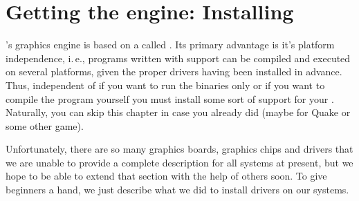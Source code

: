 
\chapter{Getting the engine: Installing  \label{opengl}}

\FlightGear's graphics engine is based on a  called
. Its primary advantage is it's platform independence, i.\,e., programs
written with  support can be compiled and executed on several platforms,
given the proper drivers having been installed in advance. Thus, independent of if you
want to run the binaries only or if you want to compile the program yourself you must
install some sort of  support for your . Naturally, you
can skip this chapter in case you already did (maybe for Quake or some other game).

Unfortunately, there are so many graphics boards, graphics chips and
drivers that we are unable to provide a complete description for all
systems at present, but we hope to be able to extend that section with
the help of others soon. To give beginners a hand, we just describe
what we did to install drivers on our systems.

